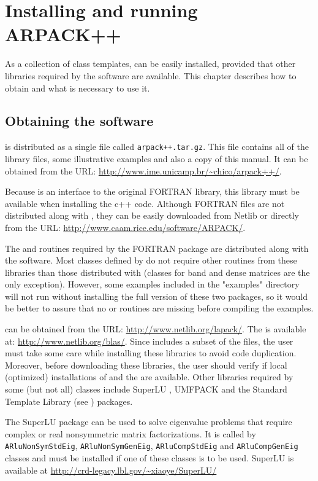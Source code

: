 
\chapter{Installing and running ARPACK++}\label{installing}
As a collection of class templates, \ARPP{} can be easily installed, provided that other libraries required by the software are available. This chapter describes how to obtain \ARPP{} and what is necessary to use it.

\section{Obtaining the software}

\ARPP{} is distributed as a single file called \texttt{arpack++.tar.gz}. This file contains all of the library files, some illustrative examples and also a copy of this manual. It can be obtained from the URL: \url{http://www.ime.unicamp.br/~chico/arpack++/}.

Because \ARPP{} is an interface to the original \ARP{} FORTRAN library, this library must be available when installing the c++ code. Although FORTRAN files are not distributed along with \ARPP{}, they can be easily downloaded from Netlib or directly from the URL: \url{http://www.caam.rice.edu/software/ARPACK/}.

The \BLAS{} and \LAP{} routines required by the \ARP{} FORTRAN package are distributed along with the software. Most classes defined by \ARPP{} do not require other routines from these libraries than those distributed with \ARP{} (classes for band and dense matrices are the only exception). However, some examples included in the \ARPP{} "examples" directory will not run without installing the full version of these two packages, so it would be better to assure that no \LAP{} or \BLAS{} routines are missing before compiling the examples.

\LAP{} can be obtained from the URL: \url{http://www.netlib.org/lapack/}. The \BLAS{} is available at: \url{http://www.netlib.org/blas/}. Since \LAP{} includes a subset of the \BLAS{} files, the user must take some care while installing these libraries to avoid code duplication. Moreover, before downloading these libraries, the user should verify if local (optimized) installations of \LAP{} and the \BLAS{} are available. 
Other libraries required by some (but not all) \ARPP{} classes include SuperLU \cite{T:3}, UMFPACK \cite{T:1} and the Standard Template Library (see \cite{T:8}) packages.

The SuperLU  package can be used to solve eigenvalue problems that require complex or real nonsymmetric matrix factorizations. It is called by \texttt{ARluNonSymStdEig}, \texttt{ARluNonSymGenEig}, \texttt{ARluCompStdEig} and \texttt{ARluCompGenEig} classes and must be installed if one of these classes is to be used. SuperLU is available at \url{http://crd-legacy.lbl.gov/\~xiaoye/SuperLU/}

